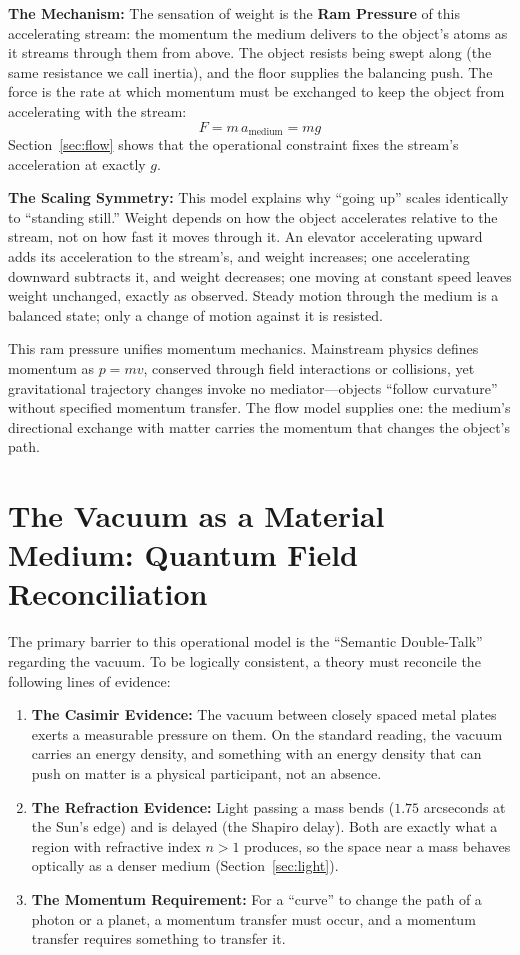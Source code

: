 \documentclass[11pt,a4paper]{article}
\begin{document}
\textbf{The Mechanism:} The sensation of weight is the \textbf{Ram Pressure} of this accelerating stream: the momentum the medium delivers to the object's atoms as it streams through them from above. The object resists being swept along (the same resistance we call inertia), and the floor supplies the balancing push. The force is the rate at which momentum must be exchanged to keep the object from accelerating with the stream:
\begin{equation}
F = m\,a_{\text{medium}} = m g
\end{equation}
Section~\ref{sec:flow} shows that the operational constraint fixes the stream's acceleration at exactly $g$.

\textbf{The Scaling Symmetry:} This model explains why ``going up'' scales identically to ``standing still.'' Weight depends on how the object accelerates relative to the stream, not on how fast it moves through it. An elevator accelerating upward adds its acceleration to the stream's, and weight increases; one accelerating downward subtracts it, and weight decreases; one moving at constant speed leaves weight unchanged, exactly as observed. Steady motion through the medium is a balanced state; only a change of motion against it is resisted.

This ram pressure unifies momentum mechanics. Mainstream physics defines momentum as $p = mv$, conserved through field interactions or collisions, yet gravitational trajectory changes invoke no mediator---objects ``follow curvature'' without specified momentum transfer. The flow model supplies one: the medium's directional exchange with matter carries the momentum that changes the object's path.

\section{The Vacuum as a Material Medium: Quantum Field Reconciliation}
The primary barrier to this operational model is the ``Semantic Double-Talk'' regarding the vacuum. To be logically consistent, a theory must reconcile the following lines of evidence:
\begin{enumerate}
    \item \textbf{The Casimir Evidence:} The vacuum between closely spaced metal plates exerts a measurable pressure on them. On the standard reading, the vacuum carries an energy density, and something with an energy density that can push on matter is a physical participant, not an absence.
    \item \textbf{The Refraction Evidence:} Light passing a mass bends ($1.75$ arcseconds at the Sun's edge) and is delayed (the Shapiro delay). Both are exactly what a region with refractive index $n > 1$ produces, so the space near a mass behaves optically as a denser medium (Section~\ref{sec:light}).
    \item \textbf{The Momentum Requirement:} For a ``curve'' to change the path of a photon or a planet, a momentum transfer must occur, and a momentum transfer requires something to transfer it.
\end{enumerate}
\end{document}
